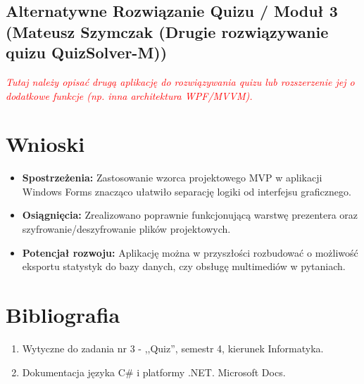 \documentclass[12pt,a4paper]{article}
\def\authorC{Mateusz Szymczak (Drugie rozwiązywanie quizu QuizSolver-M)}
\newcommand\todo[1]{\textcolor{red}{#1}}
\begin{document}
\subsection{Alternatywne Rozwiązanie Quizu / Moduł 3 (\authorC)}
\textit{\todo{Tutaj należy opisać drugą aplikację do rozwiązywania quizu lub rozszerzenie jej o dodatkowe funkcje (np. inna architektura WPF/MVVM).}}



\section{Wnioski}
\begin{itemize}
    \item \textbf{Spostrzeżenia:} Zastosowanie wzorca projektowego MVP w aplikacji Windows Forms znacząco ułatwiło separację logiki od interfejsu graficznego.
    \item \textbf{Osiągnięcia:} Zrealizowano poprawnie funkcjonującą warstwę prezentera oraz szyfrowanie/deszyfrowanie plików projektowych.
    \item \textbf{Potencjał rozwoju:} Aplikację można w przyszłości rozbudować o możliwość eksportu statystyk do bazy danych, czy obsługę multimediów w pytaniach.
\end{itemize}

\section{Bibliografia}
\begin{enumerate}
    \item Wytyczne do zadania nr 3 - ,,Quiz'', semestr 4, kierunek Informatyka.
    \item Dokumentacja języka C\# i platformy .NET. Microsoft Docs.
\end{enumerate}
\end{document}
